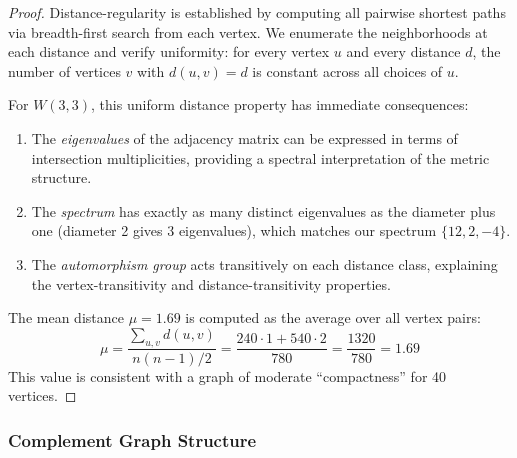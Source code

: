 \documentclass[12pt,a4paper]{article}
\begin{document}
\begin{proof}
Distance-regularity is established by computing all pairwise shortest paths via breadth-first search
from each vertex. We enumerate the neighborhoods at each distance and verify uniformity: for every
vertex $u$ and every distance $d$, the number of vertices $v$ with $d(u,v) = d$ is constant across all choices of $u$.

For $W(3,3)$, this uniform distance property has immediate consequences:
\begin{enumerate}
  \item The \emph{eigenvalues} of the adjacency matrix can be expressed in terms of intersection
        multiplicities, providing a spectral interpretation of the metric structure.
  \item The \emph{spectrum} has exactly as many distinct eigenvalues as the diameter plus one
        (diameter 2 gives 3 eigenvalues), which matches our spectrum $\{12, 2, -4\}$.
  \item The \emph{automorphism group} acts transitively on each distance class, explaining the
        vertex-transitivity and distance-transitivity properties.
\end{enumerate}

The mean distance $\mu = 1.69$ is computed as the average over all vertex pairs:
\[
  \mu = \frac{\sum_{u,v} d(u,v)}{n(n-1)/2} = \frac{240 \cdot 1 + 540 \cdot 2}{780} = \frac{1320}{780} = 1.69 %
\]
This value is consistent with a graph of moderate ``compactness'' for 40 vertices.
\end{proof}

\subsubsection{Complement Graph Structure}
\end{document}
